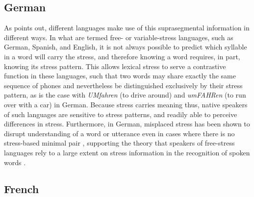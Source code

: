 	\subsection{German}
	\label{sec:stress:german}
	
		
		
					As \textcite{Cutler2005} points out, different languages make use of this suprasegmental information in different ways.
			In what are termed free- or variable-stress languages, such as German, Spanish, and English, it is not always possible to predict which syllable in a word will carry the stress, and therefore knowing a word requires, in part, knowing its stress pattern. This allows lexical stress to serve a contrastive function in these languages, such that two words may share exactly the same sequence of phones and nevertheless be distinguished exclusively by their stress pattern, as is the case with \textit{UMfahren} (to drive around) and \textit{umFAHRen} (to run over with a car) in German. %
Because stress carries meaning thus, native speakers of such languages are sensitive to stress patterns, and readily able to perceive differences in stress. %
Furthermore, in German, misplaced stress has been shown to disrupt understanding of a word or utterance even in cases where there is no stress-based minimal pair \citep{Hirschfeld1994}, supporting the theory that speakers of free-stress languages rely to a large extent on stress information in the recognition of spoken words \citep{Cutler2005}.

	\subsection{French}
	\label{sec:stress:french}

